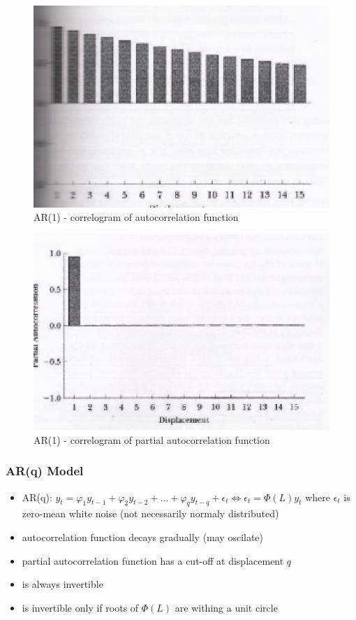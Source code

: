 \begin{figure}[htp]
\centering
\includegraphics[scale = 0.75]{AR1.eps}
\caption{AR(1) - correlogram of autocorrelation function}
\label{AR1}
\end{figure}

\begin{figure}[htp]
\centering
\includegraphics[scale = 0.75]{AR2.eps}
\caption{AR(1) - correlogram of partial autocorrelation function}
\label{AR2}
\end{figure}


\subsubsection{AR(q) Model}

\begin{itemize}
\item AR(q): $y_t = \varphi_1 y_{t-1} + \varphi_2 y_{t-2} + ... + \varphi_q y_{t-q} + \epsilon_t \Leftrightarrow \epsilon_t = \Phi(L)y_t$ where $\epsilon_t$ is zero-mean white noise (not necessarily normaly distributed)
\item autocorrelation function decays gradually (may oscilate)
\item partial autocorrelation function has a cut-off at displacement $q$
\item is always invertible
\item is invertible only if roots of $\Phi(L)$ are withing a unit circle
\end{itemize}

